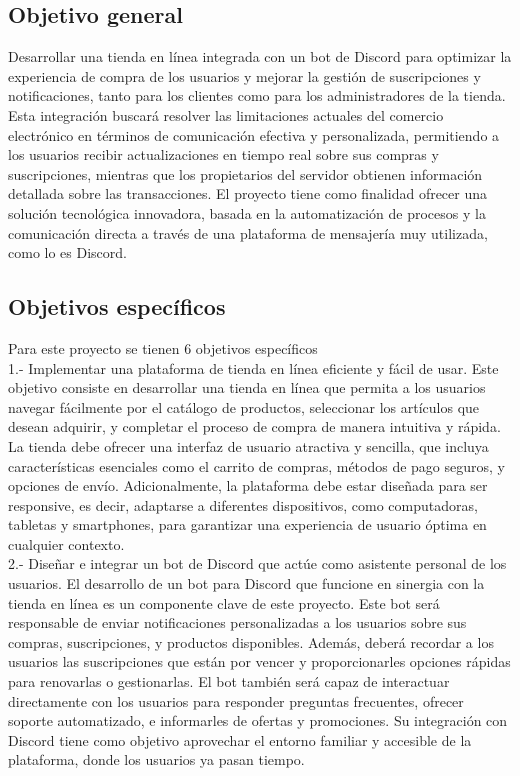 \documentclass[a4paper,12pt]{article}
\begin{document}
\subsection{Objetivo general}
Desarrollar una tienda en línea integrada con un bot de Discord para optimizar la experiencia de compra de los usuarios y mejorar la gestión de suscripciones y notificaciones, tanto para los clientes como para los administradores de la tienda. Esta integración buscará resolver las limitaciones actuales del comercio electrónico en términos de comunicación efectiva y personalizada, permitiendo a los usuarios recibir actualizaciones en tiempo real sobre sus compras y suscripciones, mientras que los propietarios del servidor obtienen información detallada sobre las transacciones. El proyecto tiene como finalidad ofrecer una solución tecnológica innovadora, basada en la automatización de procesos y la comunicación directa a través de una plataforma de mensajería muy utilizada, como lo es Discord.
\newpage
\subsection{Objetivos específicos}
Para este proyecto se tienen 6 objetivos específicos \\

1.- Implementar una plataforma de tienda en línea eficiente y fácil de usar.
Este objetivo consiste en desarrollar una tienda en línea que permita a los usuarios navegar fácilmente por el catálogo de productos, seleccionar los artículos que desean adquirir, y completar el proceso de compra de manera intuitiva y rápida. La tienda debe ofrecer una interfaz de usuario atractiva y sencilla, que incluya características esenciales como el carrito de compras, métodos de pago seguros, y opciones de envío. Adicionalmente, la plataforma debe estar diseñada para ser responsive, es decir, adaptarse a diferentes dispositivos, como computadoras, tabletas y smartphones, para garantizar una experiencia de usuario óptima en cualquier contexto.\\

2.- Diseñar e integrar un bot de Discord que actúe como asistente personal de los usuarios.
El desarrollo de un bot para Discord que funcione en sinergia con la tienda en línea es un componente clave de este proyecto. Este bot será responsable de enviar notificaciones personalizadas a los usuarios sobre sus compras, suscripciones, y productos disponibles. Además, deberá recordar a los usuarios las suscripciones que están por vencer y proporcionarles opciones rápidas para renovarlas o gestionarlas. El bot también será capaz de interactuar directamente con los usuarios para responder preguntas frecuentes, ofrecer soporte automatizado, e informarles de ofertas y promociones. Su integración con Discord tiene como objetivo aprovechar el entorno familiar y accesible de la plataforma, donde los usuarios ya pasan tiempo.\\
\end{document}

